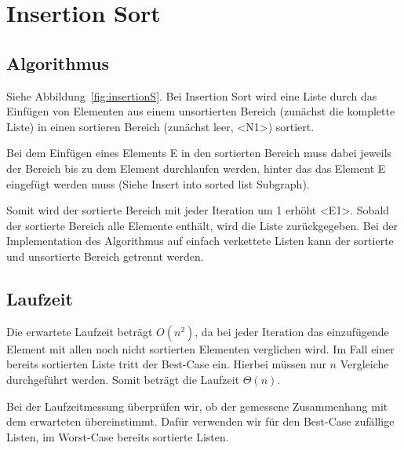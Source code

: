\documentclass[11pt]{article}
\begin{document}
    \section{Insertion Sort}\label{sec:insertion-sort}

    \subsection{Algorithmus}\label{subsec:Ialgorithmus}
    Siehe Abbildung~\ref{fig:insertionS}.
    Bei Insertion Sort wird eine Liste durch das Einfügen von Elementen aus
    einem unsortierten Bereich (zunächst die komplette Liste) in einen sortieren
    Bereich (zunächst leer, <N1>) sortiert.

    Bei dem Einfügen eines Elements E in den sortierten Bereich muss dabei
    jeweils der Bereich bis zu dem Element durchlaufen werden, hinter das das
    Element E eingefügt werden muss (Siehe \frqq Insert into sorted list\flqq
    Subgraph).

    Somit wird der sortierte Bereich mit jeder Iteration um 1 erhöht <E1>.
    Sobald der sortierte Bereich alle Elemente enthält, wird die Liste
    zurückgegeben.
    Bei der Implementation des Algorithmus auf einfach verkettete Listen
    kann der sortierte und unsortierte Bereich getrennt werden.

    \subsection{Laufzeit}\label{subsec:Ilaufzeit}
    Die erwartete Laufzeit beträgt \(O(n^2)\), da bei jeder Iteration das
    einzufügende Element mit allen noch nicht sortierten Elementen verglichen
    wird.
    Im Fall einer bereits sortierten Liste tritt der Best-Case ein.
    Hierbei müssen nur \(n\) Vergleiche durchgeführt werden.
    Somit beträgt die Laufzeit \(\Theta(n)\).

    Bei der Laufzeitmessung überprüfen wir, ob der gemessene Zusammenhang mit
    dem erwarteten übereinstimmt.
    Dafür verwenden wir für den Best-Case zufällige Listen, im Worst-Case
    bereits sortierte Listen.
\end{document}
